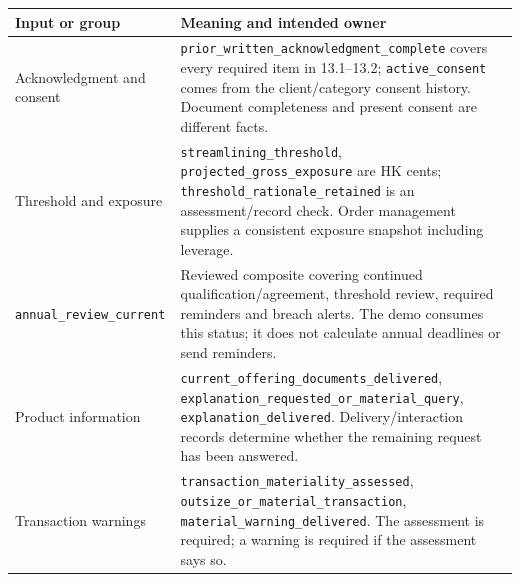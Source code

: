 \endgroup
\begin{longtable}{P{0.30\textwidth}P{0.60\textwidth}}

\toprule Input or group & Meaning and intended owner \\\midrule
\endhead
Acknowledgment and consent & \texttt{prior\_written\_acknowledgment\_complete} covers every required item in 13.1--13.2; \texttt{active\_consent} comes from the client/category consent history. Document completeness and present consent are different facts.\\
Threshold and exposure & \texttt{streamlining\_threshold}, \texttt{projected\_gross\_exposure} are HK cents; \texttt{threshold\_rationale\_retained} is an assessment/record check. Order management supplies a consistent exposure snapshot including leverage.\\
\texttt{annual\_review\_current} & Reviewed composite covering continued qualification/agreement, threshold review, required reminders and breach alerts. The demo consumes this status; it does not calculate annual deadlines or send reminders.\\
Product information & \texttt{current\_offering\_documents\_delivered}, \texttt{explanation\_requested\_or\_material\_query}, \texttt{explanation\_delivered}. Delivery/interaction records determine whether the remaining request has been answered.\\
Transaction warnings & \texttt{transaction\_materiality\_assessed}, \texttt{outsize\_or\_material\_transaction}, \texttt{material\_warning\_delivered}. The assessment is required; a warning is required if the assessment says so.\\
\bottomrule
\end{longtable}
\endgroup

